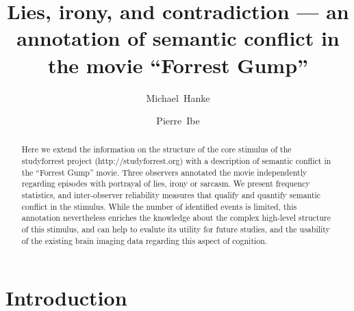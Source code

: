 \documentclass[10pt,a4paper]{article}
\begin{document}


\title{Lies, irony, and contradiction — an annotation of semantic conflict in the movie ``Forrest Gump''}

\author[1,2]{Michael~Hanke}
\author[1]{Pierre~Ibe}

\maketitle
\thispagestyle{fancy}

\begin{abstract}

  Here we extend the information on the structure of the core stimulus of the
  studyforrest project (http://studyforrest.org) with a description of semantic
  conflict in the ``Forrest Gump'' movie.  Three observers annotated the movie
  independently regarding episodes with portrayal of lies, irony or sarcasm.
  We present frequency statistics, and inter-observer reliability measures that
  qualify and quantify semantic conflict in the stimulus.  While the number of
  identified events is limited, this annotation nevertheless enriches the
  knowledge about the complex high-level structure of this stimulus, and can
  help to evalute its utility for future studies, and the usability of the
  existing brain imaging data regarding this aspect of cognition.

\end{abstract}

\section*{Introduction}

\end{document}

